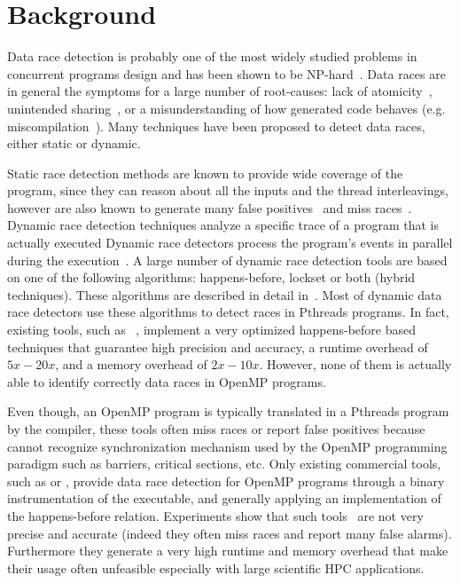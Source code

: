 \section{Background}
\label{sec:background}

Data race detection is probably one of the most widely studied problems in
concurrent programs design and has been shown to be
NP-hard~\cite{netzer-miller}.
%
Data races are in general the symptoms for a large number of root-causes: lack
of atomicity~\cite{usenix-race-erickson-et-al}, unintended
sharing~\cite{race-rv-2012-talk}, or a misunderstanding of how generated code
behaves (e.g. miscompilation~\cite{Boehm:2011:MPB:2001252.2001255}).
%
Many techniques have been proposed to detect data races, either static or
dynamic.

Static race detection methods are known to provide wide coverage of the
program, since they can reason about all the inputs and the thread
interleavings, however are also known to generate many false
positives~\cite{Pratikakis:2011:LPS:1889997.1890000} and miss
races~\cite{Voung:2007:RSR:1287624.1287654}.
%
Dynamic race detection techniques analyze a specific trace of a program
that is actually executed
%
Dynamic race detectors process the program’s events in parallel during the
execution~\cite{Lamport:1978:TCO:359545.359563, Savage:1997:EDD:269005.266641,
  Flanagan:2009, tsan}.
%
A large number of dynamic race detection tools are based on one of the
following algorithms: happens-before, lockset or both (hybrid techniques).
%
These algorithms are described in detail
in~\cite{O'Callahan:2003:HDD:966049.781528}.
%
Most of dynamic data race detectors use these algorithms to detect races in
Pthreads programs.
%
In fact, existing tools, such as \tsan~\cite{tsan}, implement a very optimized
happens-before based techniques that guarantee high precision and accuracy, a
runtime overhead of $5x-20x$, and a memory overhead of $2x-10x$.
%
However, none of them is actually able to identify correctly data races in OpenMP
programs.

Even though, an OpenMP program is typically translated in a Pthreads program
by the compiler, these tools often miss races or report false positives
because cannot recognize synchronization mechanism used by the OpenMP
programming paradigm such as barriers, critical sections, etc.
%
Only existing commercial tools, such as \insp or \sun, provide data race
detection for OpenMP programs through a binary instrumentation of the
executable, and generally applying an implementation of the happens-before
relation.
%
Experiments show that such tools~\cite{Protze:2014:TPL:2688361.2688369} are
not very precise and accurate (indeed they often miss races and report many
false alarms).
%
Furthermore they generate a very high runtime and memory overhead that make
their usage often unfeasible especially with large scientific HPC
applications.


